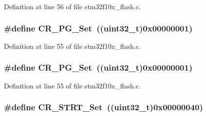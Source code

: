 Definition at line 56 of file stm32f10x\+\_\+flash.\+c.

\subsubsection[{\texorpdfstring{C\+R\+\_\+\+P\+G\+\_\+\+Set}{CR_PG_Set}}]{\setlength{\rightskip}{0pt plus 5cm}\#define C\+R\+\_\+\+P\+G\+\_\+\+Set~(({\bf uint32\+\_\+t})0x00000001)}\hypertarget{group___f_l_a_s_h___private___defines_gaf4fdb45c4a4d30dcddc389ec920f720f}{}\label{group___f_l_a_s_h___private___defines_gaf4fdb45c4a4d30dcddc389ec920f720f}


Definition at line 55 of file stm32f10x\+\_\+flash.\+c.

\subsubsection[{\texorpdfstring{C\+R\+\_\+\+P\+G\+\_\+\+Set}{CR_PG_Set}}]{\setlength{\rightskip}{0pt plus 5cm}\#define C\+R\+\_\+\+P\+G\+\_\+\+Set~(({\bf uint32\+\_\+t})0x00000001)}\hypertarget{group___f_l_a_s_h___private___defines_gaf4fdb45c4a4d30dcddc389ec920f720f}{}\label{group___f_l_a_s_h___private___defines_gaf4fdb45c4a4d30dcddc389ec920f720f}


Definition at line 55 of file stm32f10x\+\_\+flash.\+c.

\subsubsection[{\texorpdfstring{C\+R\+\_\+\+S\+T\+R\+T\+\_\+\+Set}{CR_STRT_Set}}]{\setlength{\rightskip}{0pt plus 5cm}\#define C\+R\+\_\+\+S\+T\+R\+T\+\_\+\+Set~(({\bf uint32\+\_\+t})0x00000040)}\hypertarget{group___f_l_a_s_h___private___defines_ga0e6349818d8602ffffc56e5e04d9ab13}{}\label{group___f_l_a_s_h___private___defines_ga0e6349818d8602ffffc56e5e04d9ab13}


